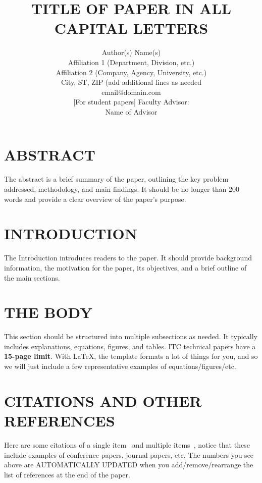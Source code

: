 \documentclass[12pt]{article}
\title{\Large \vspace{-0.5in}
\MakeUppercase{Title of Paper in All Capital Letters}}
\author{Author(s) Name(s)\\
    \normalsize Affiliation 1 (Department, Division, etc.)\\
    \normalsize Affiliation 2 (Company, Agency, University, etc.)\\
    \normalsize City, ST, ZIP (add additional lines as needed\\
    \normalsize email@domain.com\\[6pt]
    [For student papers] Faculty Advisor: \\
    Name of Advisor}
\date{}
\begin{document}
\maketitle %





\section{\MakeUppercase{Abstract}}

\noindent
The abstract is a brief summary of the paper, outlining the key problem addressed, methodology, and main findings. It should be no longer than 200 words and provide a clear overview of the paper’s purpose.



\section{\MakeUppercase{Introduction}}

\noindent
The Introduction introduces readers to the paper. It should provide background information, the motivation for the paper, its objectives, and a brief outline of the main sections.



\section{\MakeUppercase{The Body}}
\label{sec:Body}

\noindent
This section should be structured into multiple subsections as needed. It typically includes explanations, equations, figures, and tables. ITC technical papers have a {\bf 15-page limit}. With LaTeX, the template formats a lot of things for you, and so we will just include a few representative examples of equations/figures/etc.



\section{\MakeUppercase{Citations and Other References}}
\label{sec:Body}

\noindent

Here are some citations of a single item~\cite{CcsdsOrangeBook} and multiple items~\cite{ChalfantIrving,CoverBook,DapperHill,ForneyVa,Irig106-04,LiSimon}, notice that these include examples of conference papers, journal papers, etc. The numbers you see above are AUTOMATICALLY UPDATED when you add/remove/rearrange the list of references at the end of the paper.
\end{document}
